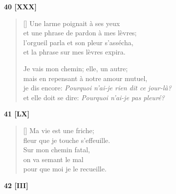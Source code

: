 \documentclass[a4paper,12pt]{book}
\begin{document}
\bigskip

\begin{center}
  \textbf{40 [XXX]}
\end{center}


\begin{verse}[\versewidth]
  Une larme poignait à ses yeux \\
  et une phrase de pardon à mes lèvres; \\
  l'orgueil parla et son pleur s'assécha, \\
  et la phrase sur mes lèvres expira.

  Je vais mon chemin; elle, un autre; \\
  mais en repensant à notre amour mutuel, \\
  je dis encore: \emph{Pourquoi n'ai-je rien dit ce jour-là?} \\
  et elle doit se dire: \emph{Pourquoi n'ai-je pas pleuré?}
\end{verse}

\bigskip

\begin{center}
  \textbf{41 [LX]}
\end{center}

\settowidth{\versewidth}{fleur que je touche s'effeuille.}

\begin{verse}[\versewidth]
  Ma vie est une friche; \\
  fleur que je touche s'effeuille. \\
  Sur mon chemin fatal, \\
  on va semant le mal \\
  pour que moi je le recueille.
\end{verse}

\bigskip

\begin{center}
  \textbf{42 [III]}
\end{center}

\settowidth{\versewidth}{comme au travers d'un tulle,}
\end{document}
